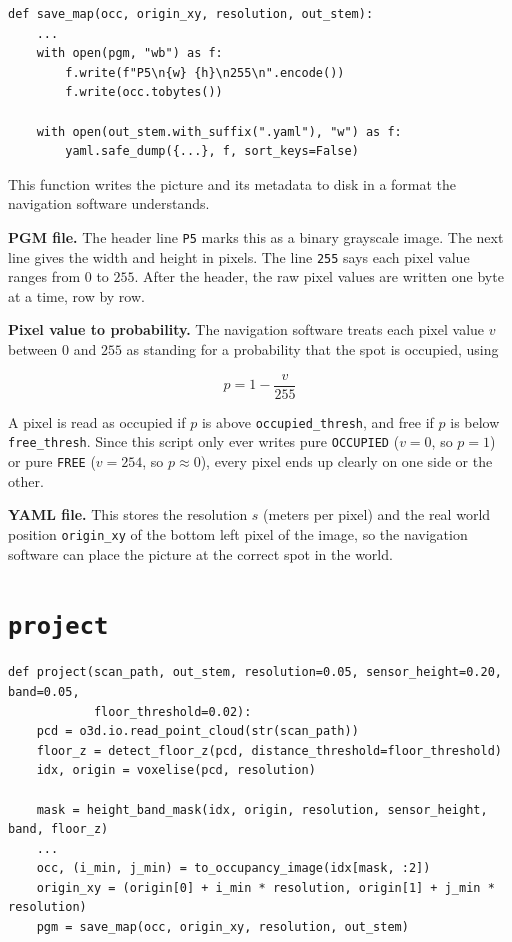 \documentclass[11pt]{article}
\begin{document}
\begin{lstlisting}
def save_map(occ, origin_xy, resolution, out_stem):
    ...
    with open(pgm, "wb") as f:
        f.write(f"P5\n{w} {h}\n255\n".encode())
        f.write(occ.tobytes())

    with open(out_stem.with_suffix(".yaml"), "w") as f:
        yaml.safe_dump({...}, f, sort_keys=False)
\end{lstlisting}

This function writes the picture and its metadata to disk in a format the navigation software understands.

\textbf{PGM file.} The header line \texttt{P5} marks this as a binary grayscale image. The next line gives the width and height in pixels. The line \texttt{255} says each pixel value ranges from $0$ to $255$. After the header, the raw pixel values are written one byte at a time, row by row.

\textbf{Pixel value to probability.} The navigation software treats each pixel value $v$ between $0$ and $255$ as standing for a probability that the spot is occupied, using

\[
p = 1 - \frac{v}{255}
\]

A pixel is read as occupied if $p$ is above \texttt{occupied\_thresh}, and free if $p$ is below \texttt{free\_thresh}. Since this script only ever writes pure \texttt{OCCUPIED} ($v=0$, so $p=1$) or pure \texttt{FREE} ($v=254$, so $p \approx 0$), every pixel ends up clearly on one side or the other.

\textbf{YAML file.} This stores the resolution $s$ (meters per pixel) and the real world position \texttt{origin\_xy} of the bottom left pixel of the image, so the navigation software can place the picture at the correct spot in the world.

\section{\texttt{project}}

\begin{lstlisting}
def project(scan_path, out_stem, resolution=0.05, sensor_height=0.20, band=0.05,
            floor_threshold=0.02):
    pcd = o3d.io.read_point_cloud(str(scan_path))
    floor_z = detect_floor_z(pcd, distance_threshold=floor_threshold)
    idx, origin = voxelise(pcd, resolution)

    mask = height_band_mask(idx, origin, resolution, sensor_height, band, floor_z)
    ...
    occ, (i_min, j_min) = to_occupancy_image(idx[mask, :2])
    origin_xy = (origin[0] + i_min * resolution, origin[1] + j_min * resolution)
    pgm = save_map(occ, origin_xy, resolution, out_stem)
\end{lstlisting}
\end{document}
